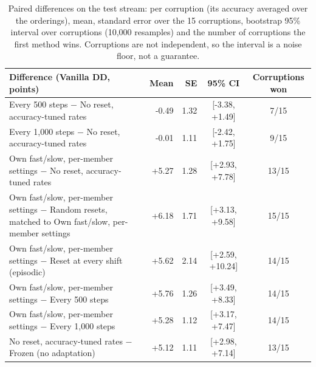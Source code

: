 \begin{table}[t]
  \centering\small
  \begin{tabular}{@{}lrrcc@{}}
    \toprule
    Difference (Vanilla DD, points) & Mean & SE & 95\% CI & Corruptions won \\
    \midrule
    Every 500 steps $-$ No reset, accuracy-tuned rates & -0.49 & 1.32 & [-3.38, +1.49] & 7/15 \\
    Every 1,000 steps $-$ No reset, accuracy-tuned rates & -0.01 & 1.11 & [-2.42, +1.75] & 9/15 \\
    Own fast/slow, per-member settings $-$ No reset, accuracy-tuned rates & +5.27 & 1.28 & [+2.93, +7.78] & 13/15 \\
    Own fast/slow, per-member settings $-$ Random resets, matched to Own fast/slow, per-member settings & +6.18 & 1.71 & [+3.13, +9.58] & 15/15 \\
    Own fast/slow, per-member settings $-$ Reset at every shift (episodic) & +5.62 & 2.14 & [+2.59, +10.24] & 14/15 \\
    Own fast/slow, per-member settings $-$ Every 500 steps & +5.76 & 1.26 & [+3.49, +8.33] & 14/15 \\
    Own fast/slow, per-member settings $-$ Every 1,000 steps & +5.28 & 1.12 & [+3.17, +7.47] & 14/15 \\
    No reset, accuracy-tuned rates $-$ Frozen (no adaptation) & +5.12 & 1.11 & [+2.98, +7.14] & 13/15 \\
    \bottomrule
  \end{tabular}
  \caption{Paired differences on the test stream: per corruption (its accuracy averaged over the orderings), mean, standard error over the 15 corruptions, bootstrap 95\% interval over corruptions (10,000 resamples) and the number of corruptions the first method wins. Corruptions are not independent, so the interval is a noise floor, not a guarantee.}
  \label{tab:final_paired}
\end{table}

